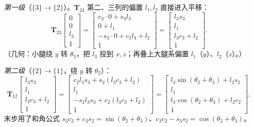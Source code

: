 \emph{第一级}（$\{3\}\!\to\!\{2\}$）。$\mathbf{T}_{23}$ 第二、三列的偏置 $l_1,l_2$ 直接进入平移：
\begin{equation}
  \mathbf{T}_{23}\begin{bmatrix}0\\0\\l_3\\1\end{bmatrix}
  =\begin{bmatrix}c_3\!\cdot\!0+s_3 l_3\\[1pt] 0+l_1\\[1pt] -s_3\!\cdot\!0+c_3 l_3+l_2\\[1pt] 1\end{bmatrix}
  =\begin{bmatrix}l_3 s_3\\ l_1\\ l_3 c_3+l_2\\ 1\end{bmatrix}.
  \label{eq:qk-fk-step1}
\end{equation}
（几何：小腿绕 $y$ 转 $\theta_3$，把 $l_3$ 投到 $x,z$；再叠上大腿系偏置 $l_1$（$y$）、$l_2$（$z$）。）

\emph{第二级}（$\{2\}\!\to\!\{1\}$，绕 $y$ 转 $\theta_2$）：
\begin{equation}
  \mathbf{T}_{12}\begin{bmatrix}l_3 s_3\\ l_1\\ l_3 c_3+l_2\\ 1\end{bmatrix}
  =\begin{bmatrix}c_2 l_3 s_3+s_2(l_3 c_3+l_2)\\ l_1\\ -s_2 l_3 s_3+c_2(l_3 c_3+l_2)\\ 1\end{bmatrix}
  =\begin{bmatrix}l_3\sin(\theta_2{+}\theta_3)+l_2 s_2\\ l_1\\ l_3\cos(\theta_2{+}\theta_3)+l_2 c_2\\ 1\end{bmatrix},
  \label{eq:qk-fk-step2}
\end{equation}
末步用了和角公式 $s_3 c_2+c_3 s_2=\sin(\theta_2{+}\theta_3)$、$c_3 c_2-s_3 s_2=\cos(\theta_2{+}\theta_3)$。

